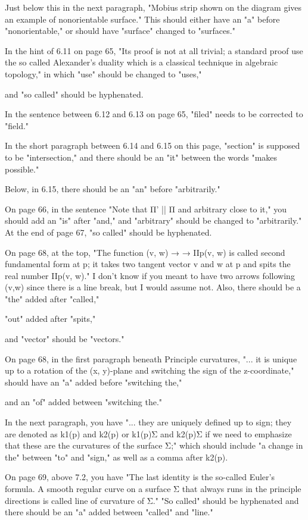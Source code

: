  Just below this in the next paragraph, "Mobius strip shown on the diagram gives an example of nonorientable surface." This should either have an "a" before "nonorientable," or should have "surface" changed to "surfaces." 
 
 In the hint of 6.11 on page 65, "Its proof is not at all trivial; a standard proof use the so called Alexander’s duality which is a classical technique in algebraic topology," in which "use" should be changed to "uses," 
 
 and "so called" should be hyphenated. 
 
 In the sentence between 6.12 and 6.13 on page 65, "filed" needs to be corrected to "field." 
 
 In the short paragraph between 6.14 and 6.15 on this page, "section" is supposed to be "intersection," and there should be an "it" between the words "makes possible." 
 
 Below, in 6.15, there should be an "an" before "arbitrarily." 
 
 On page 66, in the sentence "Note that Π' || Π and arbitrary close to it," you should add an "is" after "and," and "arbitrary" should be changed to "arbitrarily." At the end of page 67, "so called" should be hyphenated. 
 
 On page 68, at the top, "The function (v, w) → → IIp(v, w) is called second fundamental form at p; it takes two tangent vector v and w at p and spits the real number IIp(v, w)." I don't know if you meant to have two arrows following (v,w) since there is a line break, but I would assume not. Also, there should be a "the" added after "called," 
 
 "out" added after "spits," 
 
 and "vector" should be "vectors." 
 
 On page 68, in the first paragraph beneath Principle curvatures, "... it is unique up to a rotation of the (x, y)-plane and switching the sign of the z-coordinate," should have an "a" added before "switching the," 
 
 and an "of" added between "switching the." 
 
 In the next paragraph, you have "... they are uniquely defined up to sign; they are denoted as k1(p) and k2(p) or k1(p)Σ and k2(p)Σ if we need to emphasize that these are the curvatures of the surface Σ;" which should include "a change in the" between "to" and "sign," as well as a comma after k2(p). 
 
 On page 69, above 7.2, you have "The last identity is the so-called Euler’s formula. A smooth regular curve on a surface Σ that always runs in the principle directions is called line of curvature of Σ." "So called" should be hyphenated and there should be an "a" added between "called" and "line." 
 
